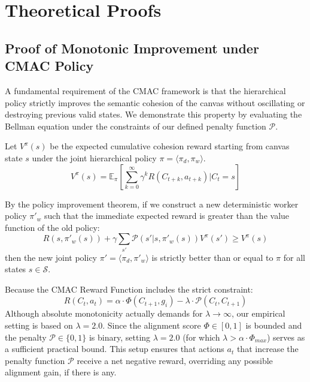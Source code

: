 \documentclass[pdflatex,sn-mathphys-num]{sn-jnl}
\begin{document}
\section{Theoretical Proofs}

\subsection{Proof of Monotonic Improvement under CMAC Policy}
A fundamental requirement of the CMAC framework is that the hierarchical policy strictly improves the semantic cohesion of the canvas without oscillating or destroying previous valid states. We demonstrate this property by evaluating the Bellman equation under the constraints of our defined penalty function $\mathcal{P}$.

Let $V^{\pi}(s)$ be the expected cumulative cohesion reward starting from canvas state $s$ under the joint hierarchical policy $\pi = \langle \pi_d, \pi_w \rangle$.
\begin{equation}
    V^{\pi}(s) = \mathbb{E}_{\pi} \left[ \sum_{k=0}^{\infty} \gamma^k R(C_{t+k}, a_{t+k}) \Big| C_t = s \right]
\end{equation}

By the policy improvement theorem, if we construct a new deterministic worker policy $\pi'_w$ such that the immediate expected reward is greater than the value function of the old policy:
\begin{equation}
    R(s, \pi'_w(s)) + \gamma \sum_{s'} \mathcal{P}(s'|s,\pi'_w(s)) V^{\pi}(s') \geq V^{\pi}(s)
\end{equation}
then the new joint policy $\pi' = \langle \pi_d, \pi'_w \rangle$ is strictly better than or equal to $\pi$ for all states $s \in \mathcal{S}$.

Because the CMAC Reward Function includes the strict constraint:
\begin{equation}
    R(C_t, a_t) = \alpha \cdot \Phi(C_{t+1}, g_i) - \lambda \cdot \mathcal{P}(C_{t}, C_{t+1})
\end{equation}
Although absolute monotonicity actually demands for $\lambda \to \infty$, our empirical setting is based on $\lambda = 2.0$. Since the alignment score $\Phi \in [0,1]$ is bounded and the penalty $\mathcal{P} \in \{0,1\}$ is binary, setting $\lambda = 2.0$ (for which $\lambda > \alpha \cdot \Phi_{max}$) serves as a sufficient practical bound. This setup ensures that actions $a_t$ that increase the penalty function $\mathcal{P}$ receive a net negative reward, overriding any possible alignment gain, if there is any.
\end{document}
